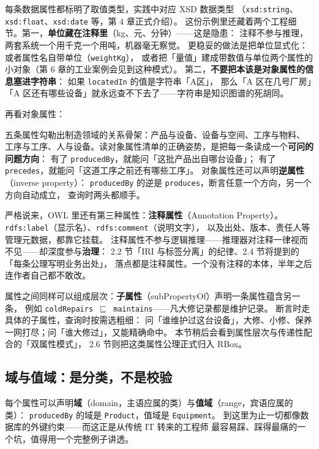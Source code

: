 每条数据属性都标明了取值类型，实践中对应 XSD 数据类型
（\texttt{xsd:string}、\texttt{xsd:float}、\texttt{xsd:date} 等，第 4 章正式介绍）。
这份示例里还藏着两个工程细节。第一，\textbf{单位藏在注释里}（kg、元、分钟）——这是隐患：
注释不参与推理，两套系统一个用千克一个用吨，机器毫无察觉。
更稳妥的做法是把单位显式化：或者属性名自带单位（\texttt{weightKg}），
或者把「量值」建成带数值与单位两个属性的小对象（第 6 章的工业案例会见到这种模式）。
第二，\textbf{不要把本该是对象属性的信息塞进字符串}：
如果 \texttt{locatedIn} 的值是字符串「A区」，
那么「A 区在几号厂房」「A 区还有哪些设备」就永远查不下去了——字符串是知识图谱的死胡同。

再看对象属性：



五条属性勾勒出制造领域的关系骨架：产品与设备、设备与空间、工序与物料、
工序与工序、人与设备。读对象属性清单的正确姿势，是把每一条读成一个\textbf{可问的问题方向}：
有了 \texttt{producedBy}，就能问「这批产品出自哪台设备」；
有了 \texttt{precedes}，就能问「这道工序之前还有哪些工序」。
对象属性还可以声明\textbf{逆属性}（inverse property）：
\texttt{producedBy} 的逆是 \texttt{produces}，断言任意一个方向，另一个方向自动成立，
查询时两头都顺手。

严格说来，OWL 里还有第三种属性：\textbf{注释属性}（Annotation Property）。
\texttt{rdfs:label}（显示名）、\texttt{rdfs:comment}（说明文字），
以及出处、版本、责任人等管理元数据，都靠它挂载。
注释属性不参与逻辑推理——推理器对注释一律视而不见——却深度参与\textbf{治理}：
2.2 节「IRI 与标签分离」的纪律、2.4 节将提到的「每条公理写明业务出处」，
落点都是注释属性。一个没有注释的本体，半年之后连作者自己都不敢改。

属性之间同样可以组成层次：\textbf{子属性}（subPropertyOf）声明一条属性蕴含另一条，
例如 \texttt{coldRepairs \(\sqsubseteq\) maintains}——凡大修记录都是维护记录。
断言时走具体的子属性，查询时按需选粗细：
问「谁维护过这台设备」，大修、小修、保养一网打尽；问「谁大修过」，又能精确命中。
本节稍后会看到属性层次与传递性配合的「双属性模式」，
2.6 节则把这类属性公理正式归入 RBox。

\subsection{域与值域：是分类，不是校验}

每个属性可以声明\textbf{域}（domain，主语应属的类）与\textbf{值域}（range，宾语应属的类）：
\texttt{producedBy} 的域是 \texttt{Product}，值域是 \texttt{Equipment}。
到这里为止一切都像数据库的外键约束——而这正是从传统 IT 转来的工程师
最容易踩、踩得最痛的一个坑，值得用一个完整例子讲透。

